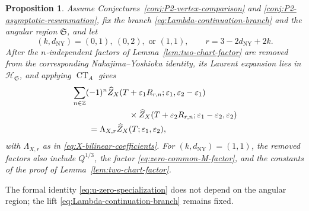 \documentclass{amsart}
\newtheorem{proposition}{Proposition}
\theoremstyle{definition}
\numberwithin{equation}{section}
\newcommand{\Z}{\mathbb Z}
\newcommand{\eps}{\varepsilon}
\begin{document}
\begin{proposition}
\label{prop:u-zero-specialization}
Assume Conjectures~\ref{conj:P2-vertex-comparison} and \ref{conj:P2-asymptotic-resummation}, fix the branch \eqref{eq:Lambda-continuation-branch} and the angular region \(\mathfrak S\), and let
\[
 (k,d_{\mathrm{NY}})=(0,1),\ (0,2),\text{ or }(1,1),
 \qquad r=3-2d_{\mathrm{NY}}+2k.
\]
After the \(n\)-independent factors of Lemma~\ref{lem:two-chart-factor} are removed from the corresponding Nakajima--Yoshioka identity, its Laurent expansion lies in \(\mathscr H_{\mathfrak S}\), and applying \(\operatorname{CT}_A\) gives
\begin{equation}
\begin{aligned}
 &\sum_{n\in\Z}(-1)^n
 \widehat Z_X
 (T+\eps_1R_{r,n};\eps_1,\eps_2-\eps_1)\\
 &\hspace{24mm}\times
 \widehat Z_X
 (T+\eps_2R_{r,n};\eps_1-\eps_2,\eps_2)\\
 &\qquad=\Lambda_{X,r}\widehat Z_X(T;\eps_1,\eps_2),
\end{aligned}
\label{eq:u-zero-specialization}
\end{equation}
with \(\Lambda_{X,r}\) as in \eqref{eq:X-bilinear-coefficients}.  For \((k,d_{\mathrm{NY}})=(1,1)\), the removed factors also include \(Q^{1/3}\), the factor \eqref{eq:zero-common-M-factor}, and the constants of the proof of Lemma~\ref{lem:two-chart-factor}.
\end{proposition}

The formal identity \eqref{eq:u-zero-specialization} does not depend on the angular region; the lift \eqref{eq:Lambda-continuation-branch} remains fixed.
\end{document}
